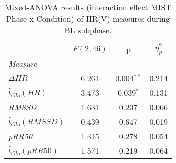 \begin{table}[th!]
\centering
\caption{Mixed-ANOVA results (interaction effect MIST Phase x Condition) of HR(V) measures during BL subphase.}
\label{tab:cft_mist_interaction_bl}

\begin{tabular}{l||SSS}
\toprule
{} & {$F(2, 46)$} &           {p} & {$\eta^2_p$} \\
\textit{Measure}                &              &               &              \\
\midrule
\textit{$\Delta HR$}            &        6.261 &  0.004$^{**}$ &        0.214 \\
\textit{$\hat{t}_{Glo}(HR)$}    &        3.473 &   0.039$^{*}$ &        0.131 \\
\textit{RMSSD}                  &        1.631 &    0.207$^{}$ &        0.066 \\
\textit{$\hat{t}_{Glo}(RMSSD)$} &        0.439 &    0.647$^{}$ &        0.019 \\
\textit{pRR50}                  &        1.315 &    0.278$^{}$ &        0.054 \\
\textit{$\hat{t}_{Glo}(pRR50)$} &        1.571 &    0.219$^{}$ &        0.064 \\
\bottomrule
\end{tabular}
\end{table}
